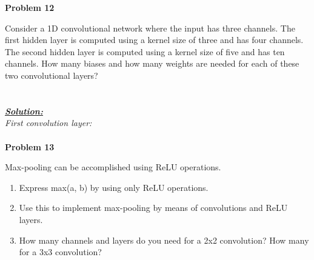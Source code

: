 \documentclass{article}
\begin{document}
\newpage
\noindent \textbf{Problem 12}

\noindent Consider a 1D convolutional network where the input has three channels. The first 
hidden layer is computed using a kernel size of three and has four channels. The second
hidden layer is computed using a kernel size of five and has ten channels. How many 
biases and how many weights are needed for each of these two convolutional layers? \\ \\ \\

\noindent \underline{\textbf{\textit{Solution:}}} \\ 

\noindent \textit{First convolution layer:} \\ \\




\newpage
\noindent \textbf{Problem 13}

\noindent Max-pooling can be accomplished using ReLU operations.
\begin{enumerate} [label=\Alph*]
    
    \item Express max(a, b) by using only ReLU operations.
    \item Use this to implement max-pooling by means of convolutions and ReLU layers.
    \item How many channels and layers do you need for a 2x2 convolution? How many for a 3x3 convolution?\\ \\ \\
\end{enumerate}\
\end{document}
